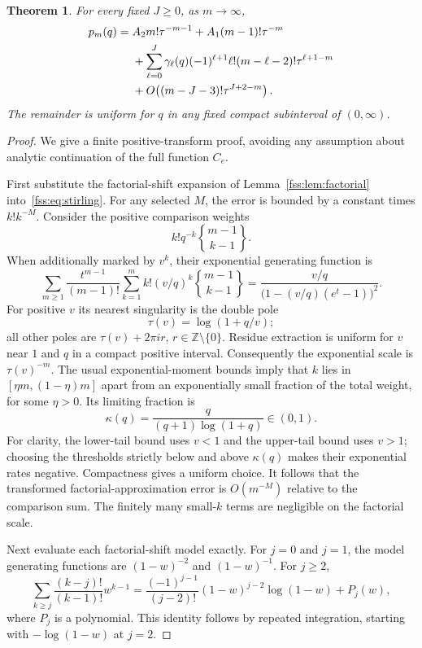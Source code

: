 \documentclass[11pt]{article}
\newtheorem{theorem}{Theorem}
\newcommand{\Stir}[2]{\genfrac\{\}{0pt}{}{#1}{#2}}
\begin{document}
\begin{theorem}\label{fss:thm:late}
For every fixed $J\ge0$, as $m\to\infty$,
\begin{align}\label{fss:eq:latethm}
 p_m(q)={}& A_2m!\tau^{-m-1}+A_1(m-1)!\tau^{-m}\notag\\
 &+\sum_{\ell=0}^J\gamma_\ell(q)(-1)^{\ell+1}\ell!
 (m-\ell-2)!\tau^{\ell+1-m}\notag\\
 &+O\!\left((m-J-3)!\tau^{J+2-m}\right).
\end{align}
The remainder is uniform for $q$ in any fixed compact subinterval of $(0,\infty)$.
\end{theorem}
\begin{proof}
We give a finite positive-transform proof, avoiding any assumption about analytic continuation of the full function $C_e$.

First substitute the factorial-shift expansion of Lemma~\ref{fss:lem:factorial} into~\eqref{fss:eq:stirling}. For any selected $M$, the error is bounded by a constant times $k!k^{-M}$. Consider the positive comparison weights
\[
 k!q^{-k}\Stir{m-1}{k-1}.
\]
When additionally marked by $v^k$, their exponential generating function is
\begin{equation}\label{fss:eq:marked}
 \sum_{m\ge1}\frac{t^{m-1}}{(m-1)!}
 \sum_{k=1}^mk!(v/q)^k\Stir{m-1}{k-1}
 =\frac{v/q}{\bigl(1-(v/q)(e^t-1)\bigr)^2}.
\end{equation}
For positive $v$ its nearest singularity is the double pole
\[
 \tau(v)=\log(1+q/v);
\]
all other poles are $\tau(v)+2\pi i r$, $r\in\mathbb Z\setminus\{0\}$. Residue extraction is uniform for $v$ near $1$ and $q$ in a compact positive interval. Consequently the exponential scale is $\tau(v)^{-m}$. The usual exponential-moment bounds imply that $k$ lies in $[\eta m,(1-\eta)m]$ apart from an exponentially small fraction of the total weight, for some $\eta>0$. Its limiting fraction is
\[
 \kappa(q)=\frac{q}{(q+1)\log(1+q)}\in(0,1).
\]
For clarity, the lower-tail bound uses $v<1$ and the upper-tail bound uses $v>1$; choosing the thresholds strictly below and above $\kappa(q)$ makes their exponential rates negative. Compactness gives a uniform choice. It follows that the transformed factorial-approximation error is $O(m^{-M})$ relative to the comparison sum. The finitely many small-$k$ terms are negligible on the factorial scale.

Next evaluate each factorial-shift model exactly. For $j=0$ and $j=1$, the model generating functions are $(1-w)^{-2}$ and $(1-w)^{-1}$. For $j\ge2$,
\begin{equation}\label{fss:eq:model}
 \sum_{k\ge j}\frac{(k-j)!}{(k-1)!}w^{k-1}
 =\frac{(-1)^{j-1}}{(j-2)!}(1-w)^{j-2}\log(1-w)+P_j(w),
\end{equation}
where $P_j$ is a polynomial. This identity follows by repeated integration, starting with $-\log(1-w)$ at $j=2$.


\end{proof}
\end{document}
